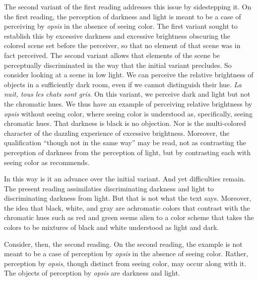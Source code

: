 The second variant of the first reading addresses this issue by sidestepping it. On the first reading, the perception of darkness and light is meant to be a case of perceiving by \emph{opsis} in the absence of seeing color. The first variant sought to establish this by excessive darkness and excessive brightness obscuring the colored scene set before the perceiver, so that no element of that scene was in fact perceived. The second variant allows that elements of the scene be perceptually discriminated in the way that the initial variant precludes. So consider looking at a scene in low light. We can perceive the relative brightness of objects in a sufficiently dark room, even if we cannot distinguish their hue. \emph{La nuit, tous les chats sont gris}. On this variant, we perceive dark and light but not the chromatic hues. We thus have an example of perceiving relative brightness by \emph{opsis} without seeing color, where seeing color is understood as, specifically, seeing chromatic hues. That darkness is black is no objection. Nor is the multi-colored character of the dazzling experience of excessive brightness. Moreover, the qualification ``though not in the same way'' may be read, not as contrasting the perception of darkness from the perception of light, but by contrasting each with seeing color as \citet[275]{Ross:1961uq} recommends.

In this way is it an advance over the initial variant. And yet difficulties remain. The present reading assimilaties discriminating darkness and light to discriminating darkness from light. But that is not what the text says. Moreover, the idea that black, white, and gray are achromatic colors that contrast with the chromatic hues such as red and green seems alien to a color scheme that takes the colors to be mixtures of black and white understood as light and dark.

Consider, then, the second reading. On the second reading, the example is not meant to be a case of perception by \emph{opsis} in the absence of seeing color. Rather, perception by \emph{opsis}, though distinct from seeing color, may occur along with it. The objects of perception by \emph{opsis} are darkness and light. 

